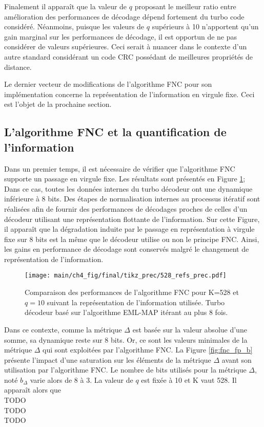 Finalement il apparaît que la valeur de $q$ proposant le meilleur ratio entre amélioration des performances de décodage 
dépend fortement du turbo code considéré. Néanmoins, puisque les valeurs de $q$ supérieurs à 10 n'apportent qu'un gain 
marginal sur les performances de décodage, il est opportun de ne pas considérer de valeurs supérieures. Ceci serait à 
nuancer dans le contexte d'un autre standard considérant un code CRC possédant de meilleures propriétés de distance.

Le dernier vecteur de modifications de l'algorithme FNC pour son implémentation concerne la représentation de 
l'information en virgule fixe. Ceci est l'objet de la prochaine section.


\subsection{L'algorithme FNC et la quantification de l'information}
Dans un premier temps, il est nécessaire de vérifier que l'algorithme FNC supporte un passage en virgule fixe.
Les résultats sont présentés en Figure \ref{fig:fnc_fp}; Dans ce cas, toutes les données internes du turbo 
décodeur ont une dynamique inférieure à 8 bits. Des étapes de normalisation internes au processus itératif sont 
réalisées afin de fournir des performances de décodages proches de celles d'un décodeur utilisant une représentation 
flottante de l'information. Sur cette Figure, il apparaît que la dégradation induite par le passage en représentation à 
virgule fixe sur 8 bits est la même que le décodeur utilise ou non le principe FNC. Ainsi, les gains en performance de 
décodage sont conservés malgré le changement de représentation de l'information.

\begin{figure}[!h]
	\centering
	\texttt{[image: main/ch4\_fig/final/tikz\_prec/528\_refs\_prec.pdf]}
	\caption{Comparaison des performances de l'algorithme FNC pour K=528 et $q=10$ suivant la représentation de 
	l'information utilisée.
	Turbo décodeur basé sur l'algorithme EML-MAP itérant au plus 8 fois.
	\label{fig:fnc_fp}}
\end{figure}

Dans ce contexte, comme la métrique $\Delta$ est basée sur la valeur absolue d'une somme, sa dynamique reste  sur 
8 bits. Or, ce sont les valeurs minimales de la métrique $\Delta$ qui sont exploitées par l'algorithme FNC. La Figure 
\ref{fig:fnc_fp_b} présente l'impact d'une saturation sur les éléments de la métrique $\Delta$ avant son utilisation par 
l'algorithme FNC. Le nombre de bits utilisés pour la métrique $\Delta$, noté $b_{\Delta}$ varie alors de 8 à 3. La 
valeur de $q$ est fixée à 10 et K vaut 528. Il apparaît alors que  \\
TODO\\TODO\\TODO

